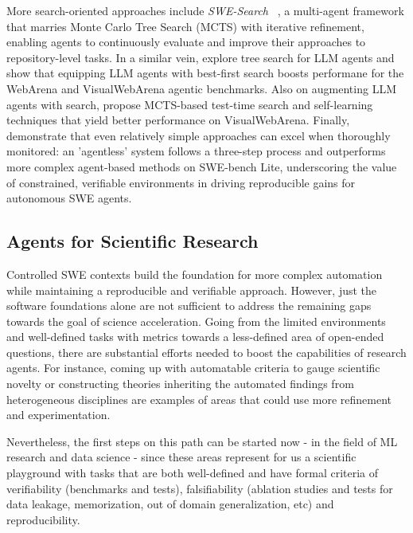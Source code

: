 \documentclass[]{fairmeta}
\begin{document}
More search-oriented approaches include \textit{SWE-Search} ~\citep{antoniades2024swesearchenhancingsoftwareagents}, a multi-agent framework that marries Monte Carlo Tree Search (MCTS) with iterative refinement, enabling agents to continuously evaluate and improve their approaches to repository-level tasks. In a similar vein, \citet{koh2024treesearchlanguagemodel} explore tree search for LLM agents and show that equipping LLM agents with best-first  search boosts performane for the WebArena  and VisualWebArena \citep{koh2024visualwebarena} agentic benchmarks. Also on augmenting LLM agents with search, \citet{yu2025exactteachingaiagents} propose MCTS-based test-time search and self-learning techniques that yield better performance on  VisualWebArena. Finally,~\citet{xiaAgentlessDemystifyingLLMbased2024} demonstrate that even relatively simple approaches can excel when thoroughly monitored: an 'agentless' system follows a three-step process and outperforms more complex agent-based methods on SWE-bench Lite, underscoring the value of constrained, verifiable environments in driving reproducible gains for autonomous SWE agents.


\subsection{Agents for Scientific Research}

Controlled SWE contexts build the foundation for more complex automation while maintaining a reproducible and verifiable approach. However, just the software foundations alone are not sufficient to address the remaining gaps towards the goal of science acceleration. Going from the limited environments and well-defined tasks with metrics towards a less-defined area of open-ended questions, there are substantial efforts needed to boost the capabilities of research agents. For instance, coming up with automatable criteria to gauge scientific novelty or constructing theories inheriting the automated findings from heterogeneous disciplines are examples of areas that could use more refinement and experimentation. 

Nevertheless, the first steps on this path can be started now - in the field of ML research and data science - since these areas represent for us a scientific playground with tasks that are both well-defined and have formal criteria of verifiability (benchmarks and tests), falsifiability (ablation studies and tests for data leakage, memorization, out of domain generalization, etc) and reproducibility.
\end{document}
